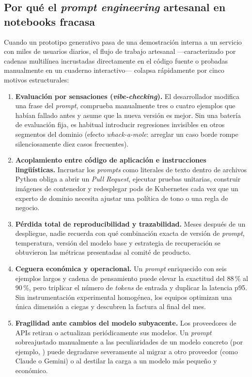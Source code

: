 \subsection{Por qué el \textit{prompt engineering} artesanal en notebooks fracasa}\label{subsec:fracaso-artesanal}

Cuando un prototipo generativo pasa de una demostración interna a un servicio con miles de usuarios diarios, el flujo de trabajo artesanal ---caracterizado por cadenas multilínea incrustadas directamente en el código fuente o probadas manualmente en un cuaderno interactivo--- colapsa rápidamente por cinco motivos estructurales:

\begin{enumerate}
  \item \textbf{Evaluación por sensaciones (\textit{vibe-checking}).} El desarrollador modifica una frase del \textit{prompt}, comprueba manualmente tres o cuatro ejemplos que habían fallado antes y asume que la nueva versión es mejor. Sin una batería de evaluación fija, es habitual introducir regresiones invisibles en otros segmentos del dominio (efecto \textit{whack-a-mole}: arreglar un caso borde rompe silenciosamente diez casos frecuentes).
  \item \textbf{Acoplamiento entre código de aplicación e instrucciones lingüísticas.} Incrustar los \textit{prompts} como literales de texto dentro de archivos Python obliga a abrir un \textit{Pull Request}, ejecutar pruebas unitarias, construir imágenes de contenedor y redesplegar pods de Kubernetes cada vez que un experto de dominio necesita ajustar una política de tono o una regla de negocio.
  \item \textbf{Pérdida total de reproducibilidad y trazabilidad.} Meses después de un despliegue, nadie recuerda con qué combinación exacta de versión de \textit{prompt}, temperatura, versión del modelo base y estrategia de recuperación se obtuvieron las métricas presentadas al comité de producto.
  \item \textbf{Ceguera económica y operacional.} Un \textit{prompt} enriquecido con seis ejemplos largos y cadena de pensamiento puede elevar la exactitud del 88\,\% al 90\,\%, pero triplicar el número de \textit{tokens} de entrada y duplicar la latencia p95. Sin instrumentación experimental homogénea, los equipos optimizan una única dimensión a ciegas y descubren la factura al final del mes.
  \item \textbf{Fragilidad ante cambios del modelo subyacente.} Los proveedores de APIs retiran o actualizan periódicamente sus modelos. Un \textit{prompt} sobreajustado manualmente a las peculiaridades de un modelo concreto (por ejemplo, ) puede degradarse severamente al migrar a otro proveedor (como Claude o Gemini) o al destilar la carga a un modelo más pequeño y económico.
\end{enumerate}

